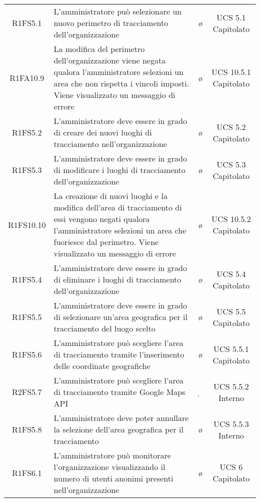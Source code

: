 {\begin{longtable}{ c C{4cm} c c}
R1FS5.1 & L'amministratore può selezionare un nuovo perimetro di tracciamento dell'organizzazione & \o & UCS 5.1 Capitolato\\

R1FA10.9 & La modifica del perimetro dell'organizzazione viene negata qualora l'amministratore selezioni un area che non rispetta i vincoli imposti. Viene visualizzato un messaggio di errore & \o & UCS 10.5.1 Capitolato \\

R1FS5.2 & L'amministratore deve essere in grado di creare dei nuovi luoghi di tracciamento nell'organizzazione & \o & UCS 5.2 Capitolato\\

R1FS5.3 & L'amministratore deve essere in grado di modificare i luoghi di tracciamento dell'organizzazione  & \o & UCS 5.3 Capitolato\\

R1FS10.10 & La creazione di nuovi luoghi e la modifica dell'area di tracciamento di essi vengono negati qualora l'amministratore selezioni un area che fuoriesce dal perimetro. Viene visualizzato un messaggio di errore & \o & UCS 10.5.2 Capitolato \\

R1FS5.4 & L'amministratore deve essere in grado di eliminare i luoghi di tracciamento dell'organizzazione  & \o & UCS 5.4 Capitolato\\

R1FS5.5 & L'amministratore deve essere in grado di selezionare un'area geografica per il tracciamento del luogo scelto  & \o & UCS 5.5 Capitolato\\

R1FS5.6 &  L'amministratore può scegliere l'area di tracciamento tramite l'inserimento delle coordinate geografiche & \o & UCS 5.5.1 Capitolato\\

R2FS5.7 & L'amministratore può scegliere l'area di tracciamento tramite Google Maps API & \d & UCS 5.5.2 Interno\\

R1FS5.8 & L'amministratore deve poter annullare la selezione dell'area geografica per il tracciamento & \o & UCS 5.5.3 Interno\\

R1FS6.1 & L'amministratore può monitorare l'organizzazione visualizzando il numero di utenti anonimi presenti nell'organizzazione & \o & UCS 6 Capitolato\\


\end{longtable}}
